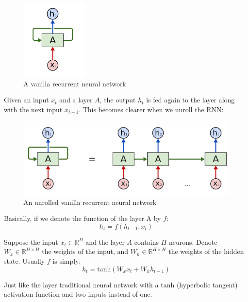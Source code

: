\begin{figure}[H]
    \centering
    \includegraphics[width=0.3\textwidth]{Images/vanilla-rnn.png}
    \caption{A vanilla recurrent neural network \cite{colah}}
    \label{vanilla-rnn}
\end{figure}

Given an input $x_t$ and a layer $A$, the output $h_t$ is fed again to the layer along with the next input $x_{t+1}$. This becomes clearer when we unroll the RNN:

\begin{figure}[H]
    \centering
    \includegraphics[width=\textwidth]{Images/vanilla-rnn2.png}
    \caption{An unrolled vanilla recurrent neural network \cite{colah}}
\end{figure}

Basically, if we denote the function of the layer A by $f$:
\begin{equation}
    h_t = f(h_{t-1}, x_t)
\end{equation}

Suppose the input $x_t \in \mathbb{R}^{D}$ and the layer $A$ contains $H$ neurons. Denote $W_x \in \mathbb{R}^{D\times H}$ the weights of the input, and $W_h \in \mathbb{R}^{H\times H}$ the weights of the hidden state. Usually $f$ is simply:
\begin{equation}
    h_t = \text{tanh}(W_x x_t + W_h h_{t-1})
\end{equation}

Just like the layer traditional neural network with a tanh (hyperbolic tangent) activation function and two inputs instead of one.

